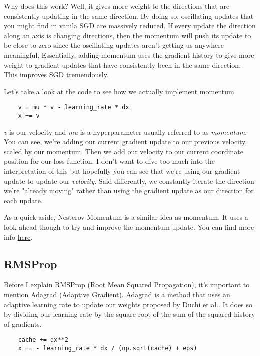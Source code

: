 \documentclass[12pt]{article}
\begin{document}
Why does this work? Well, it gives more weight
to the directions that are consistently updating in the same direction. By doing so, oscillating 
updates that you might find in vanila SGD are massively reduced. If every update the direction along
an axis is changing directions, then the momentum will push its update to be close to zero since 
the oscillating updates aren't getting us anywhere meaningful. Essentially, adding momentum 
uses the gradient history to give more weight to gradient updates that have consistently been in 
the same direction. This improves SGD tremendously. 

Let's take a look at the code to see how we actually implement momentum. 

\begin{verbatim}
    v = mu * v - learning_rate * dx 
    x += v
\end{verbatim}

\emph{v} is our velocity and \emph{mu} is a hyperparameter usually referred to as \emph{momentum}. 
You can see, we're adding our current gradient update to our previous velocity, scaled by our momentum. 
Then we add our velocity to our current coordinate position for our loss function. I don't want to dive too 
much into the interpretation of this but hopefully you can see that we're using our gradient update to 
update our \emph{velocity}. Said differently, we constantly iterate the direction we're "already moving" 
rather than using the gradient update as our direction for each update. 

As a quick aside, Nesterov Momentum is a similar idea as momentum. It uses a look ahead though 
to try and improve the momentum update. You can find more info \href{https://cs231n.github.io/neural-networks-3/#sgd}{here}.

\subsection{RMSProp}
Before I explain RMSProp (Root Mean Squared Propagation), it's important to mention Adagrad (Adaptive
Gradient). Adagrad is a method that uses an adaptive learning rate to update our weights proposed by 
\href{https://jmlr.org/papers/v12/duchi11a.html}{Duchi et al.}. It does so 
by dividing our learning rate by the square root of the sum of the squared history of gradients. 

\begin{verbatim}
    cache += dx**2
    x += - learning_rate * dx / (np.sqrt(cache) + eps)
\end{verbatim}
\end{document}
